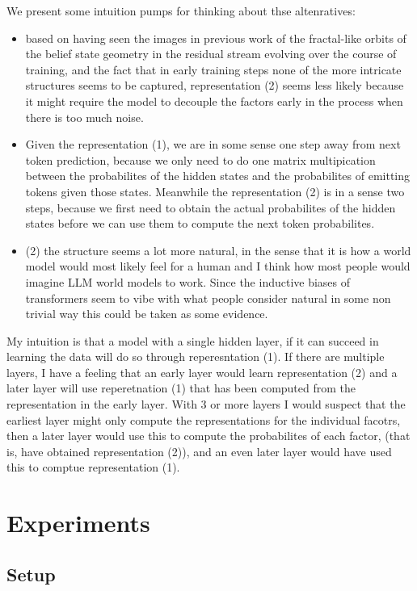\documentclass[11pt,a4paper]{article}
\begin{document}
We present some intuition pumps for thinking about thse altenratives:
\begin{itemize}
\item based on having seen the images in previous work of the fractal-like orbits of the belief state geometry in the residual stream evolving over the course of training, and the fact that in early training steps none of the more intricate structures seems to be captured, representation (2) seems less likely because it might require the model to decouple the factors early in the process when there is too much noise.
\item Given the representation (1), we are in some sense one step away from next token prediction, because we only need to do one matrix multipication between the probabilites of the hidden states and the probabilites of emitting tokens given those states. Meanwhile the representation (2) is in a sense two steps, because we first need to obtain the actual probabilites of the hidden states before we can use them to compute the next token probabilites.
\item (2) the structure seems a lot more natural, in the sense that it is how a world model would most likely feel for a human and I think how most people would imagine LLM world models to work. Since the inductive biases of transformers seem to vibe with what people consider natural in some non trivial way this could be taken as some evidence.
\end{itemize} 

My intuition is that a model with a single hidden layer, if it can succeed in learning the data will do so through reperesntation (1). If there are multiple layers, I have a feeling that an early layer would learn representation (2) and a later layer will use reperetnation (1) that has been computed from the representation in the early layer. With 3 or more layers I would suspect that the earliest layer might only compute the representations for the individual facotrs, then a later layer would use this to compute the probabilites of each factor, (that is, have obtained representation (2)), and an even later layer would have used this to comptue representation (1).


\section{Experiments}

\subsection*{Setup}
\end{document}

